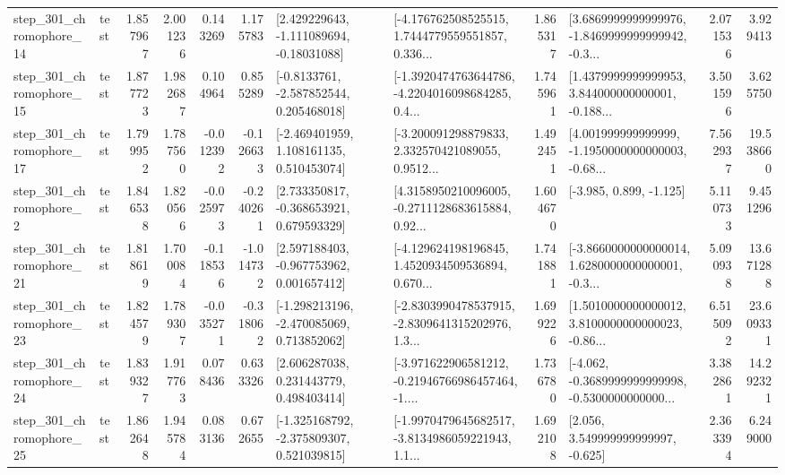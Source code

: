 \begin{tabular}{llrrrrllrlrr}
  step\_301\_chromophore\_14 &      test &      1.857967 &    2.001236 &      0.143269 &  1.175783 &    [2.429229643, -1.111089694, -0.18031088] &  [-4.176762508525515, 1.7444779559551857, 0.336... &       1.865317 &  [3.6869999999999976, -1.8469999999999942, -0.3... &            2.071536 &          3.929413 \\
  step\_301\_chromophore\_15 &      test &      1.877723 &    1.982687 &      0.104964 &  0.855289 &     [-0.8133761, -2.587852544, 0.205468018] &  [-1.3920474763644786, -4.2204016098684285, 0.4... &       1.745961 &  [1.4379999999999953, 3.844000000000001, -0.188... &            3.501596 &          3.625750 \\
  step\_301\_chromophore\_17 &      test &      1.799952 &    1.787560 &     -0.012392 & -0.126633 &    [-2.469401959, 1.108161135, 0.510453074] &  [-3.200091298879833, 2.332570421089055, 0.9512... &       1.492451 &  [4.001999999999999, -1.1950000000000003, -0.68... &            7.562937 &         19.538660 \\
   step\_301\_chromophore\_2 &      test &      1.846538 &    1.820566 &     -0.025973 & -0.240261 &    [2.733350817, -0.368653921, 0.679593329] &  [4.3158950210096005, -0.2711128683615884, 0.92... &       1.604670 &                            [-3.985, 0.899, -1.125] &            5.110733 &          9.451296 \\
  step\_301\_chromophore\_21 &      test &      1.818619 &    1.700084 &     -0.118536 & -1.014732 &    [2.597188403, -0.967753962, 0.001657412] &  [-4.129624198196845, 1.4520934509536894, 0.670... &       1.741881 &  [-3.8660000000000014, 1.6280000000000001, -0.3... &            5.090938 &         13.671288 \\
  step\_301\_chromophore\_23 &      test &      1.824579 &    1.789307 &     -0.035271 & -0.318062 &   [-1.298213196, -2.470085069, 0.713852062] &  [-2.8303990478537915, -2.8309641315202976, 1.3... &       1.699226 &  [1.5010000000000012, 3.8100000000000023, -0.86... &            6.515092 &         23.609331 \\
  step\_301\_chromophore\_24 &      test &      1.839327 &    1.917763 &      0.078436 &  0.633326 &     [2.606287038, 0.231443779, 0.498403414] &  [-3.971622906581212, -0.21946766986457464, -1.... &       1.736780 &  [-4.062, -0.3689999999999998, -0.5300000000000... &            3.382861 &         14.292321 \\
  step\_301\_chromophore\_25 &      test &      1.862648 &    1.945784 &      0.083136 &  0.672655 &   [-1.325168792, -2.375809307, 0.521039815] &  [-1.9970479645682517, -3.8134986059221943, 1.1... &       1.692108 &                 [2.056, 3.549999999999997, -0.625] &            2.363394 &          6.249000 \\

\end{tabular}
